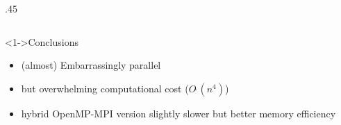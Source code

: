 \documentclass{beamer}
\newcommand{\SO}[1]{\ensuremath{O\tilde\ (#1)}\xspace}
\begin{document}
\begin{frame}
\begin{columns}
\begin{column} {.45\textwidth}
\begin{center}
        \end{center}
      \end{column}
      \end{columns}
      \begin{block}<1->{Conclusions}
        \begin{itemize}
        \item (almost) Embarrassingly parallel
        \item but overwhelming computational cost ($\SO{n^4}$)
        \item hybrid OpenMP-MPI version slightly slower but better memory efficiency
        \end{itemize}
      \end{block}
\end{frame}

\end{document}
